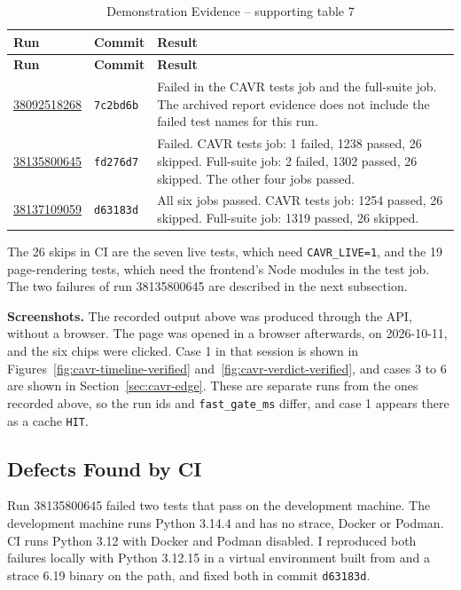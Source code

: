 \setlength{\tabcolsep}{3pt}
\begin{longtable}{p{}p{}p{}}
\caption{Demonstration Evidence -- supporting table 7}\\
\toprule
\textbf{Run} & \textbf{Commit} & \textbf{Result}\\
\midrule
\endfirsthead
\toprule
\textbf{Run} & \textbf{Commit} & \textbf{Result}\\
\midrule
\endhead
\href{https://github.com/SheharyarAli-Dev/Working-POC/actions/runs/38092518268}{38092518268} & \texttt{7c2bd6b} & Failed in the CAVR tests job and the full-suite job. The archived report evidence does not include the failed test names for this run.\\
\href{https://github.com/SheharyarAli-Dev/Working-POC/actions/runs/38135800645}{38135800645} & \texttt{fd276d7} & Failed. CAVR tests job: 1 failed, 1238 passed, 26 skipped. Full-suite job: 2 failed, 1302 passed, 26 skipped. The other four jobs passed.\\
\href{https://github.com/SheharyarAli-Dev/Working-POC/actions/runs/38137109059}{38137109059} & \texttt{d63183d} & All six jobs passed. CAVR tests job: 1254 passed, 26 skipped. Full-suite job: 1319 passed, 26 skipped.\\
\bottomrule
\end{longtable}
\setlength{\tabcolsep}{6pt}

\begin{sloppypar}
The 26 skips in CI are the seven live tests, which need \texttt{CAVR\_LIVE=1}, and the 19 page-rendering tests, which need the frontend's Node modules in the test job. The two failures of run 38135800645 are described in the next subsection.
\end{sloppypar}

\begin{sloppypar}
\textbf{Screenshots.} The recorded output above was produced through the API, without a browser. The page was opened in a browser afterwards, on 2026-10-11, and the six chips were clicked. Case 1 in that session is shown in Figures~\ref{fig:cavr-timeline-verified} and~\ref{fig:cavr-verdict-verified}, and cases 3 to 6 are shown in Section~\ref{sec:cavr-edge}. These are separate runs from the ones recorded above, so the run ids and \texttt{fast\_gate\_ms} differ, and case 1 appears there as a cache \texttt{HIT}.
\end{sloppypar}

\subsection{Defects Found by CI}\label{sec:cavr-ci-defects}
\begin{sloppypar}
Run 38135800645 failed two tests that pass on the development machine. The development machine runs Python 3.14.4 and has no strace, Docker or Podman. CI runs Python 3.12 with Docker and Podman disabled. I reproduced both failures locally with Python 3.12.15 in a virtual environment built from  and a strace 6.19 binary on the path, and fixed both in commit \texttt{d63183d}.
\end{sloppypar}

